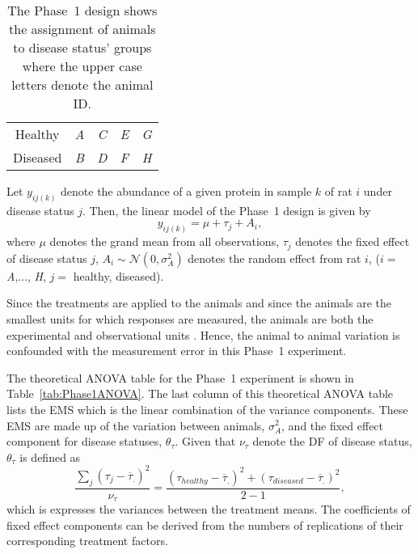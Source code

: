\documentclass[article]{jss}
\begin{document}
\begin{table}[ht]
\centering
\caption{The Phase~1 design shows the assignment of animals to disease status' groups where the upper case letters denote the animal ID.}
\begin{tabular}[t]{ccccc}
\hline 
Healthy & \textit{A} & \textit{C} & \textit{E} & \textit{G} \\ 
Diseased & \textit{B} & \textit{D} & \textit{F} & \textit{H} \\ 
\hline 
\end{tabular} 
\label{tab:phase1Design}
\end{table}

Let $y_{ij(k)}$ denote the abundance of a given protein in sample $k$ of rat $i$ under disease status $j$. Then, the linear model of the Phase~1 design is given by
\begin{equation}\label{eq:phase1Model}
y_{ij(k)}= \mu + \tau_{j} + A_{i},
\end{equation}
where $\mu$ denotes the grand mean from all observations, $\tau_{j}$ denotes the fixed effect of disease status $j$, $A_{i} \sim \mathcal{N}(0, \sigma_{A}^2)$ denotes the random effect from rat $i$, ($i=$ \textit{A},$\dots$, \textit{H}, $j=$ healthy, diseased). 

Since the treatments are applied to the animals and since the animals are the smallest units for which responses are measured, the animals are both the experimental and observational units \citep{Bailey2008}. Hence, the animal to animal variation is confounded with the measurement error in this Phase~1 experiment. 

The theoretical ANOVA table for the Phase~1 experiment is shown in Table~\ref{tab:Phase1ANOVA}. The last column of this theoretical ANOVA table lists the EMS which is the linear combination of the variance components. These EMS are made up of the variation between animals, $\sigma_{A}^2$, and the fixed effect component for disease statuses, $\theta_{\tau}$. Given that $\nu_{\tau}$ denote the DF of disease status, $\theta_{\tau}$ is defined as 
\[\frac{ \sum_{j}(\tau_{j} - \overline{\tau}_{.})^2}{\nu_{\tau}}=
\frac{(\tau_{healthy} - \overline{\tau}_{.})^2 + (\tau_{diseased} - \overline{\tau}_{.})^2}{2-1},\] 
which is expresses the variances between the treatment means. The coefficients of fixed effect components can be derived from the numbers of replications of their corresponding treatment factors. 
\end{document}
